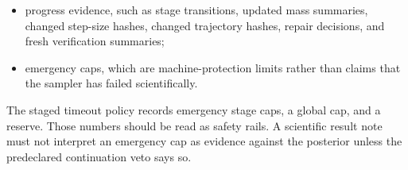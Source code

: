\begin{itemize}
  \item progress evidence, such as stage transitions, updated mass summaries,
    changed step-size hashes, changed trajectory hashes, repair decisions, and
    fresh verification summaries;
  \item emergency caps, which are machine-protection limits rather than claims
    that the sampler has failed scientifically.
\end{itemize}

The staged timeout policy records emergency stage caps, a global cap, and a
reserve.  Those numbers should be read as safety rails.  A scientific result
note must not interpret an emergency cap as evidence against the posterior
unless the predeclared continuation veto says so.
